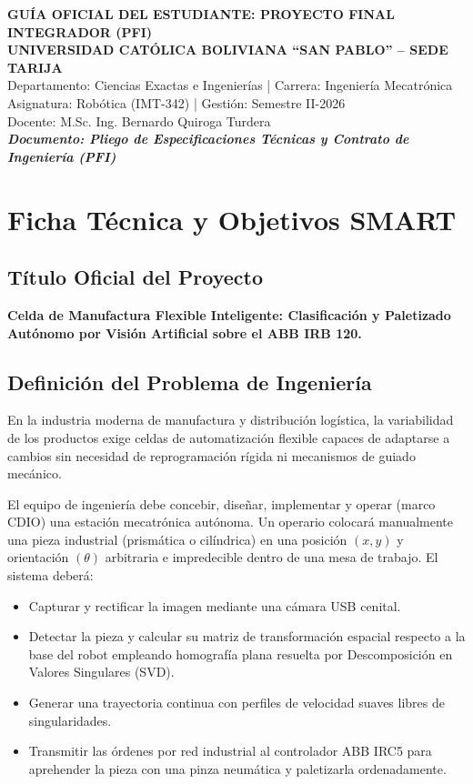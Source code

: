 \documentclass[11pt,a4paper]{article}
\begin{document}
\begin{center}
    \textbf{\Large GUÍA OFICIAL DEL ESTUDIANTE: PROYECTO FINAL INTEGRADOR (PFI)} \\
    \vspace{0.3cm}
    \textbf{\large UNIVERSIDAD CATÓLICA BOLIVIANA ``SAN PABLO'' -- SEDE TARIJA} \\
    \vspace{0.2cm}
    Departamento: Ciencias Exactas e Ingenierías | Carrera: Ingeniería Mecatrónica \\
    Asignatura: Robótica (IMT-342) | Gestión: Semestre II-2026 \\
    Docente: M.Sc. Ing. Bernardo Quiroga Turdera \\
    \vspace{0.4cm}
    \textit{\textbf{Documento: Pliego de Especificaciones Técnicas y Contrato de Ingeniería (PFI)}}
\end{center}

\vspace{0.5cm}
\section{Ficha Técnica y Objetivos SMART}

\subsection*{Título Oficial del Proyecto}
\textbf{Celda de Manufactura Flexible Inteligente: Clasificación y Paletizado Autónomo por Visión Artificial sobre el ABB IRB 120.}

\subsection*{Definición del Problema de Ingeniería}
En la industria moderna de manufactura y distribución logística, la variabilidad de los productos exige celdas de automatización flexible capaces de adaptarse a cambios sin necesidad de reprogramación rígida ni mecanismos de guiado mecánico. 

El equipo de ingeniería debe concebir, diseñar, implementar y operar (marco CDIO) una estación mecatrónica autónoma. Un operario colocará manualmente una pieza industrial (prismática o cilíndrica) en una posición $(x, y)$ y orientación $(\theta)$ arbitraria e impredecible dentro de una mesa de trabajo. El sistema deberá:
\begin{itemize}[label=\checkmark]
    \item Capturar y rectificar la imagen mediante una cámara USB cenital.
    \item Detectar la pieza y calcular su matriz de transformación espacial respecto a la base del robot empleando homografía plana resuelta por Descomposición en Valores Singulares (SVD).
    \item Generar una trayectoria continua con perfiles de velocidad suaves libres de singularidades.
    \item Transmitir las órdenes por red industrial al controlador ABB IRC5 para aprehender la pieza con una pinza neumática y paletizarla ordenadamente.
\end{itemize}
\end{document}
